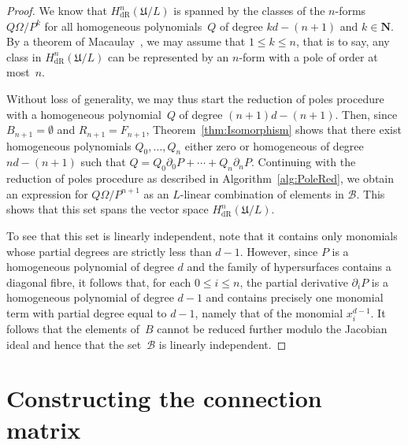 \documentclass[a4paper,11pt]{article}
\numberwithin{equation}{section}
\newcommand{\NN}{\mathbf{N}} %
\providecommand{\HdR}{H_{\text{dR}}}    %
\providecommand{\cB}{\mathcal{B}} %
\theoremstyle{definition}
\begin{document}
\begin{proof}
We know that $\HdR^n(\mathfrak{U}/L)$ is spanned by the classes of the 
$n$-forms $Q \Omega / P^k$ for all homogeneous polynomials~$Q$ of degree 
$kd-(n+1)$ and $k \in \NN$.  
By a theorem of Macaulay~\citep[\S 4, (4.11)]{Griffiths1969}, 
we may assume that $1 \leq k \leq n$, that is to say, any class in 
$\HdR^n(\mathfrak{U}/L)$ can be represented by an $n$-form with a pole 
of order at most~$n$.

Without loss of generality, we may thus start the reduction of poles 
procedure with a homogeneous polynomial~$Q$ of degree $(n+1)d-(n+1)$.  Then, 
since $B_{n+1} = \emptyset$ and $R_{n+1} = F_{n+1}$, 
Theorem~\ref{thm:Isomorphism} shows that there exist homogeneous polynomials 
$Q_0, \dotsc, Q_n$ either zero or homogeneous of degree $nd-(n+1)$ such that 
$Q = Q_0 \partial_0 P + \dotsb + Q_n \partial_n P$.  Continuing with the 
reduction of poles procedure as described in Algorithm~\ref{alg:PoleRed}, 
we obtain an expression for $Q \Omega / P^{n+1}$ as an $L$-linear combination 
of elements in $\cB$.  This shows that this set spans the vector space 
$\HdR^n(\mathfrak{U}/L)$.

To see that this set is linearly independent, note that it contains only 
monomials whose partial degrees are strictly less than $d-1$.  However, since 
$P$ is a homogeneous polynomial of degree $d$ and the family of hypersurfaces 
contains a diagonal fibre, it follows that, for each $0 \leq i \leq n$, the 
partial derivative $\partial_i P$ is a homogeneous polynomial of degree $d-1$ 
and contains precisely one monomial term with partial degree equal to $d-1$, 
namely that of the monomial $x_i^{d-1}$.  It follows that the elements of~$B$ 
cannot be reduced further modulo the Jacobian ideal and hence that the 
set~$\cB$ is linearly independent.
\end{proof}


\section{Constructing the connection matrix}
\label{sec:Connection}
\end{document}

